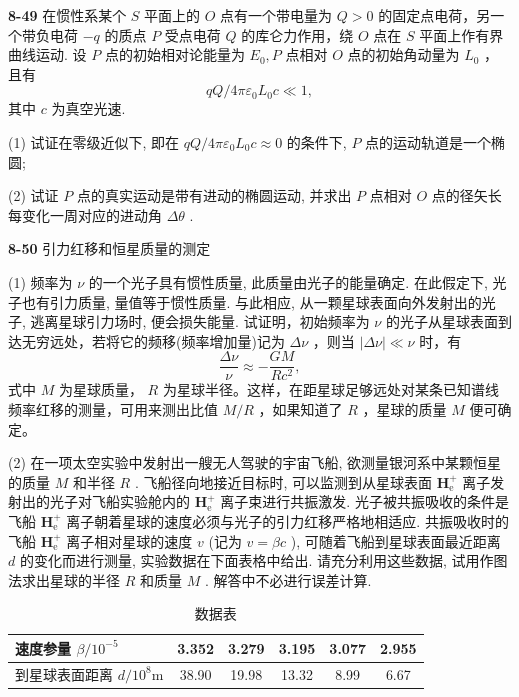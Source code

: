 \vfill

\newpage

\textbf{8-49} 在惯性系某个 $S$ 平面上的 $O$ 点有一个带电量为 $Q > 0$ 的固定点电荷，另一个带负电荷 $-q$ 的质点 $P$ 受点电荷 $Q$ 的库仑力作用，绕 $O$ 点在 $S$ 平面上作有界曲线运动. 设 $P$ 点的初始相对论能量为 $E_0, P$ 点相对 $O$ 点的初始角动量为 $L_0$ ，且有
\[
q Q / 4 \pi \varepsilon_ {0} L _ {0} c \ll 1,
\]
其中 $c$ 为真空光速.

(1) 试证在零级近似下, 即在 $qQ / 4\pi \varepsilon_0 L_0 c \approx 0$ 的条件下, $P$ 点的运动轨道是一个椭圆;

(2) 试证 $P$ 点的真实运动是带有进动的椭圆运动, 并求出 $P$ 点相对 $O$ 点的径矢长每变化一周对应的进动角 $\Delta\theta$ .

\newpage


\textbf{8-50} 引力红移和恒星质量的测定

(1) 频率为 $\nu$ 的一个光子具有惯性质量, 此质量由光子的能量确定. 在此假定下, 光子也有引力质量, 量值等于惯性质量. 与此相应, 从一颗星球表面向外发射出的光子, 逃离星球引力场时, 便会损失能量.
试证明，初始频率为 $\nu$ 的光子从星球表面到达无穷远处，若将它的频移(频率增加量)记为 $\Delta \nu$ ，则当 $|\Delta \nu| \ll \nu$ 时，有
$$
\frac {\Delta \nu}{\nu} \approx - \frac {G M}{R c ^ {2}},
$$
式中 $M$ 为星球质量， $R$ 为星球半径。这样，在距星球足够远处对某条已知谱线频率红移的测量，可用来测出比值 $M / R$ ，如果知道了 $R$ ，星球的质量 $M$ 便可确定。

(2) 在一项太空实验中发射出一艘无人驾驶的宇宙飞船, 欲测量银河系中某颗恒星的质量 $M$ 和半径 $R$ . 飞船径向地接近目标时, 可以监测到从星球表面 $\mathbf{H}_{\mathrm{e}}^{+}$ 离子发射出的光子对飞船实验舱内的 $\mathbf{H}_{\mathrm{e}}^{+}$ 离子束进行共振激发. 光子被共振吸收的条件是飞船 $\mathbf{H}_{\mathrm{e}}^{+}$ 离子朝着星球的速度必须与光子的引力红移严格地相适应. 共振吸收时的飞船 $\mathbf{H}_{\mathrm{e}}^{+}$ 离子相对星球的速度 $v$ (记为 $v = \beta c$ ), 可随着飞船到星球表面最近距离 $d$ 的变化而进行测量, 实验数据在下面表格中给出. 请充分利用这些数据, 试用作图法求出星球的半径 $R$ 和质量 $M$ . 解答中不必进行误差计算.

\begin{table}[htbp]
\centering
\caption{数据表}
\label{tab:data_grid}
\begin{tabular}{|l|c|c|c|c|c|}
\hline
速度参量 $\beta/10^{-5}$ & 3.352 & 3.279 & 3.195 & 3.077 & 2.955 \\ \hline
到星球表面距离 $d/10^{8}$m & 38.90 & 19.98 & 13.32 & 8.99 & 6.67 \\ \hline
\end{tabular}
\end{table}


